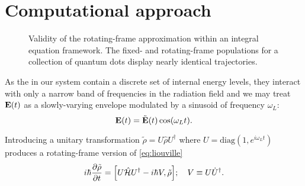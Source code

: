 \section{Computational approach}
\begin{figure}
  \centering
  
  \caption{\label{fig:frame comparison}
    Validity of the rotating-frame approximation within an integral equation framework.
    The fixed- and rotating-frame populations for a collection of quantum dots display nearly identical trajectories.
  }
\end{figure}

As the \qds{} in our system contain a discrete set of internal energy levels, they interact with only a narrow band of frequencies in the radiation field and we may treat $\vb{E}(t)$ as a slowly-varying envelope modulated by a sinusoid of frequency $\omega_L$:
\begin{equation}
  \vb{E}(t) = \tilde{\vb{E}}(t)\cos(\omega_L t).
  \label{eq:modulated field}
\end{equation}

Introducing a unitary transformation $\tilde{\rho} = U \hat{\rho} U^\dagger$ where $U = \mathrm{diag}(1, e^{i \omega_L t})$ produces a rotating-frame version of \cref{eq:liouville}
\begin{equation}
  i \hbar \pdv{\tilde{\rho}}{t} = \commutator{U \hat{\mathcal{H}} U^\dagger - i \hbar V}{\tilde{\rho}}; \quad V \equiv U \dot{U}^\dagger.
  \label{eq:rotating liouville}
\end{equation}

